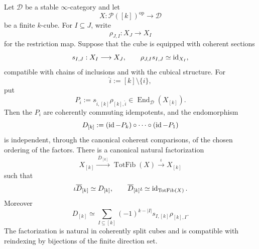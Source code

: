 \begin{lemma}
\label{lem:var-split-cube-projector}
Let \(\mathcal D\) be a stable \(\infty\)-category and let
\[
    X:\mathcal P([k])^{\mathrm{op}}\longrightarrow\mathcal D
\]
be a finite \(k\)-cube. For \(I\subseteq J\), write
\[
    \rho_{J,I}:X_J\longrightarrow X_I
\]
for the restriction map. Suppose that the cube is equipped with coherent sections
\[
    s_{I,J}:X_I\longrightarrow X_J,
    \qquad
    \rho_{J,I}s_{I,J}\simeq\operatorname{id}_{X_I},
\]
compatible with chains of inclusions and with the cubical structure. For
\[
    \widehat i:=[k]\setminus\{i\},
\]
put
\[
    P_i:=s_{\widehat i,[k]}\rho_{[k],\widehat i}
    \in\operatorname{End}_{\mathcal D}(X_{[k]}).
\]
Then the \(P_i\) are coherently commuting idempotents, and the endomorphism
\[
    D_{[k]}
    :=
    (\operatorname{id}-P_k)\circ\cdots\circ(\operatorname{id}-P_1)
\]
is independent, through the canonical coherent comparisons, of the chosen ordering of the factors. There is a canonical natural factorization
\[
    \boxed{
    X_{[k]}
    \xrightarrow{\;\overline D_{[k]}\;}
    \operatorname{TotFib}(X)
    \xrightarrow{\;\iota\;}
    X_{[k]}
    }
\]
such that
\[
    \iota\overline D_{[k]}\simeq D_{[k]},
    \qquad
    \overline D_{[k]}\iota\simeq\operatorname{id}_{\operatorname{TotFib}(X)}.
\]
Moreover
\[
    \boxed{
    D_{[k]}
    \simeq
    \sum_{I\subseteq[k]}
    (-1)^{k-|I|}
    s_{I,[k]}\rho_{[k],I}.
    }
\]
The factorization is natural in coherently split cubes and is compatible with reindexing by bijections of the finite direction set.
\end{lemma}

